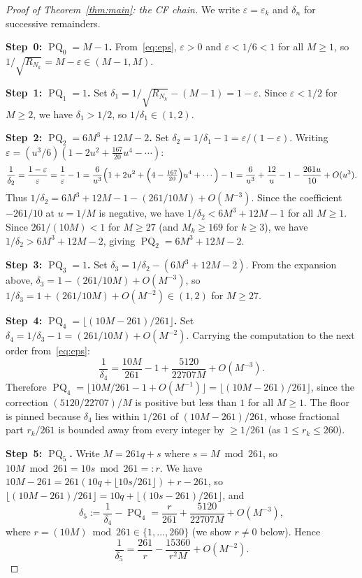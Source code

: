 \documentclass[10pt,a4paper]{amsart}
\newcommand{\floor}[1]{\lfloor #1 \rfloor}
\DeclareMathOperator{\PQ}{PQ}
\begin{document}
\begin{proof}[Proof of Theorem~\ref{thm:main}: the CF chain]
  We write $\varepsilon = \varepsilon_k$ and $\delta_n$ for successive
  remainders.

  \medskip
  \noindent\textbf{Step~0: $\PQ_0 = M-1$.}
  From~\eqref{eq:eps}, $\varepsilon > 0$ and $\varepsilon < 1/6 < 1$
  for all $M \geq 1$, so $1/\sqrt{R_{N_k}} = M - \varepsilon \in (M-1, M)$.

  \medskip
  \noindent\textbf{Step~1: $\PQ_1 = 1$.}
  Set $\delta_1 = 1/\sqrt{R_{N_k}} - (M-1) = 1 - \varepsilon$.
  Since $\varepsilon < 1/2$ for $M \geq 2$, we have $\delta_1 > 1/2$,
  so $1/\delta_1 \in (1, 2)$.

  \medskip
  \noindent\textbf{Step~2: $\PQ_2 = 6M^3+12M-2$.}
  Set $\delta_2 = 1/\delta_1 - 1 = \varepsilon/(1-\varepsilon)$.
  Writing $\varepsilon = (u^3/6)(1 - 2u^2 + \frac{167}{20}u^4 - \cdots)$:
  \[
    \frac{1}{\delta_2} = \frac{1-\varepsilon}{\varepsilon}
    = \frac{1}{\varepsilon} - 1
    = \frac{6}{u^3}\!\left(1+2u^2+\Bigl(4-\tfrac{167}{20}\Bigr)u^4+\cdots\right) - 1
    = \frac{6}{u^3}+\frac{12}{u}-1-\frac{261u}{10}+O(u^3).
  \]
  Thus $1/\delta_2 = 6M^3+12M-1-(261/10M)+O(M^{-3})$.
  Since the coefficient $-261/10$ at $u = 1/M$ is negative, we have
  $1/\delta_2 < 6M^3+12M-1$ for all $M \geq 1$.
  Since $261/(10M) < 1$ for $M \geq 27$ (and $M_k \geq 169$ for $k \geq 3$),
  we have $1/\delta_2 > 6M^3+12M-2$, giving $\PQ_2 = 6M^3+12M-2$.

  \medskip
  \noindent\textbf{Step~3: $\PQ_3 = 1$.}
  Set $\delta_3 = 1/\delta_2 - (6M^3+12M-2)$.  From the expansion above,
  $\delta_3 = 1 - (261/10M) + O(M^{-3})$, so $1/\delta_3 = 1 + (261/10M)
  + O(M^{-2}) \in (1, 2)$ for $M \geq 27$.

  \medskip
  \noindent\textbf{Step~4: $\PQ_4 = \floor{(10M-261)/261}$.}
  Set $\delta_4 = 1/\delta_3 - 1 = (261/10M) + O(M^{-2})$.
  Carrying the computation to the next order from~\eqref{eq:eps}:
  \[
    \frac{1}{\delta_4}
    = \frac{10M}{261} - 1 + \frac{5120}{22707M} + O(M^{-3}).
  \]
  Therefore $\PQ_4 = \floor{10M/261 - 1 + O(M^{-1})} = \floor{(10M-261)/261}$,
  since the correction $(5120/22707)/M$ is positive but less than $1$ for all
  $M \geq 1$.  The floor is pinned because $\delta_4$ lies within $1/261$ of
  $(10M-261)/261$, whose fractional part $r_k/261$ is bounded away from every
  integer by $\ge 1/261$ (as $1 \le r_k \le 260$).

  \medskip
  \noindent\textbf{Step~5: $\PQ_5$.}\quad
  Write $M = 261q + s$ where $s = M \bmod 261$, so
  $10M \bmod 261 = 10s \bmod 261 =: r$.  We have
  $10M - 261 = 261(10q + \floor{10s/261}) + r - 261$, so
  $\floor{(10M-261)/261} = 10q + \floor{(10s-261)/261}$, and
  \[
    \delta_5
    := \frac{1}{\delta_4} - \PQ_4
    = \frac{r}{261} + \frac{5120}{22707M} + O(M^{-3}),
  \]
  where $r = (10M) \bmod 261 \in \{1,\ldots,260\}$ (we show $r \neq 0$
  below).  Hence
  \[
    \frac{1}{\delta_5}
    = \frac{261}{r} - \frac{15360}{r^2 M} + O(M^{-2}).
  \]


\end{proof}
\end{document}
